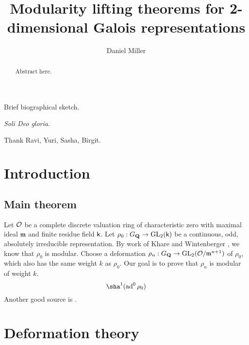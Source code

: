 \documentclass[phd,cornellheadings,draft]{cornell}
\title{Modularity lifting theorems for 2-dimensional Galois representations}
\author{Daniel Miller}
\begin{document}
\maketitle
\makecopyright

\begin{abstract}
Abstract here. 
\end{abstract}

\begin{biosketch}
Brief biographical sketch.
\end{biosketch}

\begin{dedication}
\emph{Soli Deo gloria}.
\end{dedication}

\begin{acknowledgements}
Thank Ravi, Yuri, Sasha, Birgit. 
\end{acknowledgements}

\contentspage

\normalspacing
\setcounter{page}{1}
\pagestyle{cornell}







\chapter{Introduction}

\section{Main theorem}

Let $\mathcal{O}$ be a complete discrete valuation ring of characteristic zero with maximal ideal $\mathfrak{m}$ and finite residue field $\mathsf{k}$. 
Let $\rho_0:G_{\mathbf{Q}}\to \operatorname{GL}_2(\mathsf{k})$ be a continuous, odd, absolutely irreducible representation. 
By work of Khare and Wintenberger \cite{khare-wintenberger-2009-i,khare-wintenberger-2009-ii}, we know that $\rho_0$ is modular. 
Choose a deformation $\rho_n:G_{\mathbf{Q}}\to \operatorname{GL}_2(\mathcal{O}/\mathfrak{m}^{n+1})$ of $\rho_0$, which also has the same weight $k$ as $\rho_0$. 
Our goal is to prove that $\rho_n$ is modular of weight $k$. 
\[
  \sha^1(\adjoint^0 \rho_0)
\]
Another good source is \cite{neukirch-schmidt-winberg-2008}. 





\chapter{Deformation theory}
\end{document}
